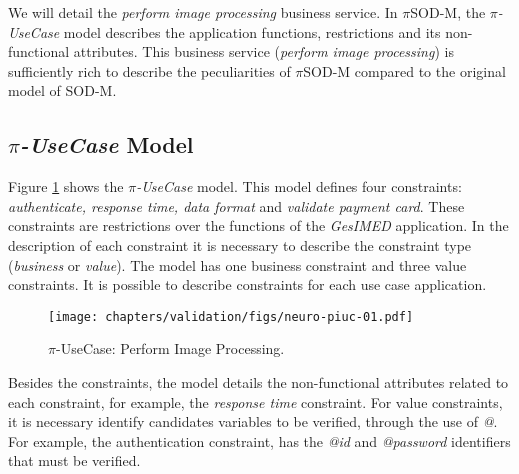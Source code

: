 


We will detail the \textit{perform image processing} business service. In $\pi$SOD-M, the \textit{$\pi$-UseCase} model
describes the application functions, restrictions and its non-functional
attributes. This business service (\textit{perform image processing}) is 
sufficiently rich to describe the peculiarities of $\pi$SOD-M
compared to the original model of SOD-M. 

\subsection{\textit{$\pi$-UseCase} Model}

Figure \ref{fig:piUseCase-imageProcessing} shows the \textit{$\pi$-UseCase}
model. This model defines four constraints: \textit{authenticate, response time,
data format} and \textit{validate payment card}. These constraints are restrictions over the functions of the
\textit{GesIMED} application. In the description of each constraint it is
necessary to describe the constraint type (\textit{business} or \textit{value}).
The model has one business constraint and three value constraints. It is
possible to describe constraints for each use case application.


\begin{figure}[ht!]
\centering
\texttt{[image: chapters/validation/figs/neuro-piuc-01.pdf]}
\caption{$\pi$-UseCase: Perform Image Processing.}
\label{fig:piUseCase-imageProcessing}
\end{figure} 


Besides the constraints, the model details the non-functional attributes
related to each constraint, for example, the \textit{response time} constraint.
For value constraints, it is necessary identify candidates variables to be
verified, through the use of \textit{@}. For example, the
authentication constraint, has the \textit{@id} and \textit{@password}
identifiers that must be verified. 

